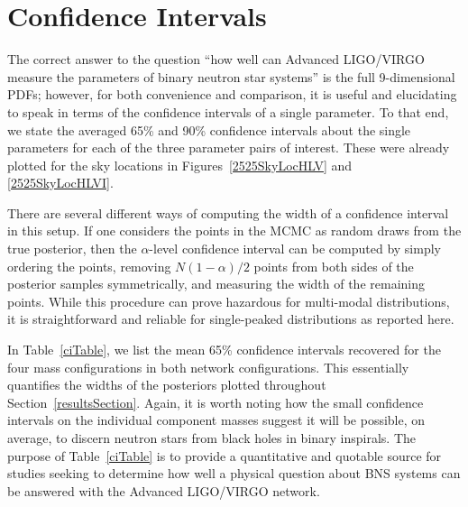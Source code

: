 \documentclass[11pt,a4paper]{emulateapj}
\newcommand{\carl}[1]{{\color{red}  #1}}
\begin{document}

\section{Confidence Intervals}
\label{ciSection}

The correct answer to the question ``how well can Advanced LIGO/VIRGO measure the parameters of binary neutron star systems'' is the full 9-dimensional PDFs; however, for both convenience and comparison, it is useful and elucidating to speak in terms of the confidence intervals of a single parameter.  To that end, we state the averaged 65\% and 90\% confidence intervals about the single parameters for each of the three parameter pairs of interest.  These were already plotted for the sky locations in Figures~\ref{2525SkyLocHLV} and \ref{2525SkyLocHLVI}.  

There are several different ways of computing the width of a confidence interval in this setup.  If one considers the points in the MCMC as random draws from the true posterior, then the $\alpha$-level confidence interval can be computed by simply ordering the points, removing $N(1-\alpha )/2$ points from both sides of the posterior samples symmetrically, and measuring the width of the remaining points.  While this procedure can prove hazardous for multi-modal distributions, it is straightforward and reliable for single-peaked distributions as reported here.

In Table~\ref{ciTable}, we list the mean 65\% confidence intervals recovered for the four mass configurations in both network configurations. 
This essentially quantifies the widths of the posteriors plotted throughout Section~\ref{resultsSection}.  Again, it is worth noting how the small confidence
intervals on the individual component masses suggest it will be possible, on average, to discern neutron stars from black holes in binary inspirals.  
The purpose of Table~\ref{ciTable} is to provide a quantitative and quotable source for studies seeking to determine how well a physical question
about BNS systems can be answered with the Advanced LIGO/VIRGO network.
 
\end{document}

